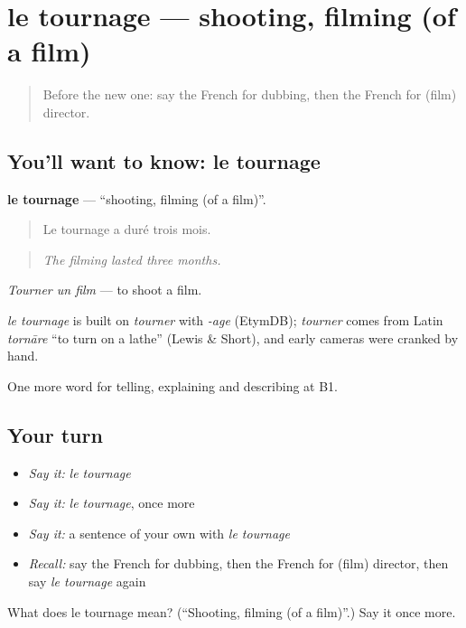 \section[le tournage]{le tournage — shooting, filming (of a film)}

\label{lesson:FR-C524-tournage}



\begin{quote}
Before the new one: say the French for dubbing, then the French for (film) director.
\end{quote}

\subsection*{You'll want to know: le tournage}
\textbf{le tournage} — \textquotedblleft{}shooting, filming (of a film)\textquotedblright{}.

\begin{quote}
Le tournage a duré trois mois.
\end{quote}

\begin{quote}
\emph{The filming lasted three months.}
\end{quote}

\emph{Tourner un film} — to shoot a film.

\begin{cousinweb}
\emph{le tournage} is built on \emph{tourner} with \emph{-age} (EtymDB); \emph{tourner} comes from Latin \emph{tornāre} \textquotedblleft{}to turn on a lathe\textquotedblright{} (Lewis \& Short), and early cameras were cranked by hand.
\end{cousinweb}

\begin{grammarlens}[title={What you've built}]
One more word for telling, explaining and describing at B1.
\end{grammarlens}

\subsection*{Your turn}
\begin{itemize}
\raggedright
  \item \emph{Say it:} \emph{le tournage}
  \item \emph{Say it:} \emph{le tournage}, once more
  \item \emph{Say it:} a sentence of your own with \emph{le tournage}
  \item \emph{Recall:} say the French for dubbing, then the French for (film) director, then say \emph{le tournage} again
\end{itemize}

\begin{tcolorbox}[breakable,colback=teal!4,colframe=teal!35!black,title={Before you move on}]
What does le tournage mean? (\textquotedblleft{}Shooting, filming (of a film)\textquotedblright{}.) Say it once more.
\end{tcolorbox}
